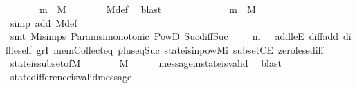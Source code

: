 \begin{isabellebody}
\ \ \ \ \ \ {\isasymLongrightarrow}\ m\ {\isasymin}\ M{\isachardoublequoteclose}\isanewline
\ \ \ \ \ \ \isamarkupfalse%
\ M{\isacharunderscore}def\ \isamarkupfalse%
\ blast\ \isanewline
\ \ \ \ \isamarkupfalse%
\ \isamarkupfalse%
\isanewline
\ \ \ \ \ \ {\isachardoublequoteopen}m\ {\isasymin}\ M{\isachardoublequoteclose}\isanewline
\ \ \ \ \ \ \isamarkupfalse%
\ {\isacharparenleft}simp\ add{\isacharcolon}\ M{\isacharunderscore}def{\isacharparenright}\isanewline
\ \ \ \ \ \ \isamarkupfalse%
\ {\isacharparenleft}smt\ M{\isacharunderscore}i{\isachardot}simps\ Params{\isachardot}{\isasymSigma}i{\isacharunderscore}monotonic\ PowD\ Suc{\isacharunderscore}diff{\isacharunderscore}Suc\ {\isacartoucheopen}{\isasymsigma}\ {\isasymin}\ {\isasymSigma}\ {\isasymand}\ m\ {\isasymin}\ {\isasymsigma}{\isacartoucheclose}\ add{\isacharunderscore}leE\ diff{\isacharunderscore}add\ diff{\isacharunderscore}le{\isacharunderscore}self\ gr{}I\ mem{\isacharunderscore}Collect{\isacharunderscore}eq\ plus{\isacharunderscore}{}{\isacharunderscore}eq{\isacharunderscore}Suc\ state{\isacharunderscore}is{\isacharunderscore}in{\isacharunderscore}pow{\isacharunderscore}M{\isacharunderscore}i\ subsetCE\ zero{\isacharunderscore}less{\isacharunderscore}diff{\isacharparenright}\isanewline
\ \ \isamarkupfalse%
%
\endisatagproof
{\isafoldproof}%
%
\isadelimproof
\isanewline
%
\endisadelimproof
\isanewline
\ \ \isamarkupfalse%
\ state{\isacharunderscore}is{\isacharunderscore}subset{\isacharunderscore}of{\isacharunderscore}M\ {\isacharcolon}\ {\isachardoublequoteopen}{\isasymforall}\ {\isasymsigma}\ {\isasymin}\ {\isasymSigma}{\isachardot}\ {\isasymsigma}\ {\isasymsubseteq}\ M{\isachardoublequoteclose}\isanewline
%
\isadelimproof
\ \ \ \ %
\endisadelimproof
%
\isatagproof
{}\isamarkupfalse%
\ message{\isacharunderscore}in{\isacharunderscore}state{\isacharunderscore}is{\isacharunderscore}valid\ \isamarkupfalse%
\ blast%
\endisatagproof
{\isafoldproof}%
%
\isadelimproof
\isanewline
%
\endisadelimproof
\ \ \isanewline
\ \ \isamarkupfalse%
\ state{\isacharunderscore}difference{\isacharunderscore}is{\isacharunderscore}valid{\isacharunderscore}message\ {\isacharcolon}\isanewline
\ \ \ \ {\isachardoublequoteopen}{\isasymforall}\ {\isasymsigma}\ {\isasymsigma}{\isacharprime}{\isachardot}\ {\isasymsigma}\ {\isasymin}\ {\isasymSigma}\ {\isasymand}\ {\isasymsigma}{\isacharprime}\ {\isasymin}\ {\isasymSigma}\isanewline

\end{isabellebody}
